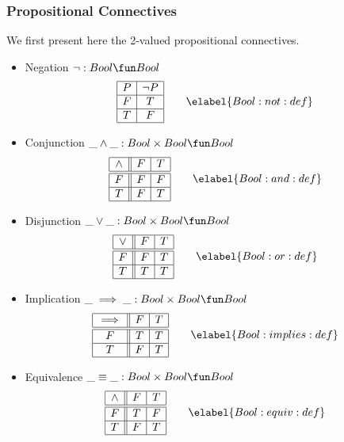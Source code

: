 \subsubsection{Propositional Connectives}

We first present here the 2-valued propositional connectives.

\begin{itemize}
%
\item Negation $\lnot : Bool \fun Bool$
$$\begin{array}{|c|c|}
  \hline
  P & \lnot P \\\hline
  F & T       \\\hline
  T & F       \\\hline
\end{array}
\qquad \elabel{Bool:not:def}
$$
%
\item Conjunction $\_\land\_ : Bool\times Bool \fun Bool$
$$\begin{array}{|c||c|c|}
  \hline
  \land & F & T \\\hline\hline
  F     & F & F \\\hline
  T     & F & T \\\hline
\end{array}
\qquad \elabel{Bool:and:def}
$$
%
\item Disjunction $\_\lor\_ : Bool\times Bool \fun Bool$
$$\begin{array}{|c||c|c|}
  \hline
  \lor  & F & T \\\hline\hline
  F     & F & T \\\hline
  T     & T & T \\\hline
\end{array}
\qquad \elabel{Bool:or:def}
$$
%
\item Implication $\_\implies\_ : Bool\times Bool \fun Bool$
$$\begin{array}{|c||c|c|}
  \hline
  \implies & F & T \\\hline\hline
  F        & T & T \\\hline
  T        & F & T \\\hline
\end{array}
\qquad \elabel{Bool:implies:def}
$$
%
\item Equivalence $\_\equiv\_ : Bool\times Bool \fun Bool$
$$\begin{array}{|c||c|c|}
  \hline
  \land & F & T \\\hline\hline
  F     & T & F \\\hline
  T     & F & T \\\hline
\end{array}
\qquad \elabel{Bool:equiv:def}
$$
\end{itemize}


